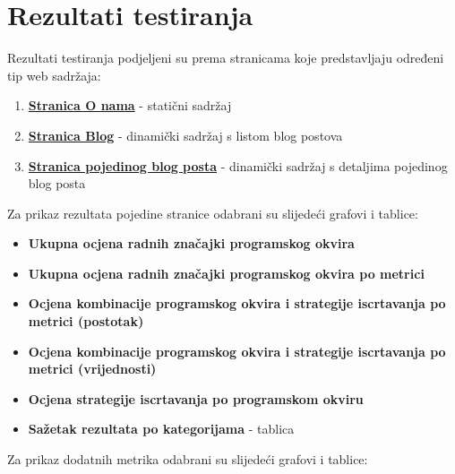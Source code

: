 \section{Rezultati testiranja}
Rezultati testiranja podjeljeni su prema stranicama koje predstavljaju određeni tip web sadržaja:

\begin{enumerate}
    \item \hyperref[sec:rezultati-o-nama]{\textbf{Stranica O nama}} - statični sadržaj
    \item \hyperref[sec:rezultati-blog]{\textbf{Stranica Blog}} - dinamički sadržaj s listom blog postova
    \item \hyperref[sec:rezultati-blog-post]{\textbf{Stranica pojedinog blog posta}} - dinamički sadržaj s detaljima pojedinog blog posta
\end{enumerate}

\bigskip
\noindent
Za prikaz rezultata pojedine stranice odabrani su slijedeći grafovi i tablice:

\begin{itemize}
    \item \textbf{Ukupna ocjena radnih značajki programskog okvira}
    \item \textbf{Ukupna ocjena radnih značajki programskog okvira po metrici}
    \item \textbf{Ocjena kombinacije programskog okvira i strategije iscrtavanja po metrici (postotak)}
    \item \textbf{Ocjena kombinacije programskog okvira i strategije iscrtavanja po metrici (vrijednosti)}
    \item \textbf{Ocjena strategije iscrtavanja po programskom okviru}
    \item \textbf{Sažetak rezultata po kategorijama} - tablica
\end{itemize}

\bigskip
\noindent
Za prikaz dodatnih metrika odabrani su slijedeći grafovi i tablice:

